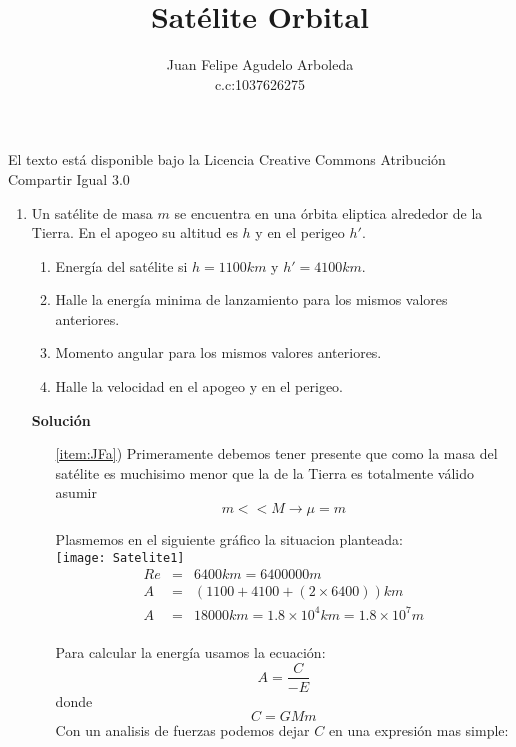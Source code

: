 \documentclass[12pt]{article}
\title{Satélite Orbital}
\author{Juan Felipe Agudelo Arboleda \\c.c:1037626275}
\begin{document}
\maketitle


El texto está disponible bajo la Licencia Creative Commons Atribución Compartir Igual 3.0
\begin{enumerate} 

\item Un satélite de masa $m$ se encuentra en una órbita eliptica alrededor de la Tierra. En el apogeo su altitud es $h$ y en el perigeo $h'$. 

 
  \begin{minipage}{0.6\linewidth}
    \begin{enumerate}
    \item Energía del satélite si $h=1100 km$ y $h'=4100 km$.
      \label{item:JFa}
    \item Halle la energía minima de lanzamiento para los mismos valores anteriores.
      \label{item:JFb}
      \item Momento angular para los mismos valores anteriores.
      \label{item:JFc}    
     \item Halle la velocidad en el apogeo y en el perigeo.
      \label{item:JFd}
    \end{enumerate}
  \end{minipage}
  
  \textbf{Solución}
  \begin{itemize}  
  
  \item[\ref{item:JFa})]
  Primeramente debemos tener presente que como la masa del satélite es muchisimo menor que la de la Tierra es totalmente válido asumir
\begin{equation} 
m<<M\rightarrow\mu=m\nonumber
\end{equation}

Plasmemos en el siguiente gráfico la situacion planteada:\\
  \texttt{[image: Satelite1]}\\
  \begin{eqnarray}
  Re&=&6400 km=6400000 m\nonumber\\ 
  A&=&(1100+4100+(2\times6400)) km\nonumber\\
  A&=&18000  km = 1.8\times10^4 km = 1.8\times10^7 m\\
   \nonumber
 \end{eqnarray}
 
 Para calcular la energía usamos la ecuación:
\begin{equation}
A=\frac{C}{-E}\nonumber
\end{equation}
donde
\begin{equation}
C=G M m\nonumber
\end{equation} 
Con un analisis de fuerzas podemos dejar $C$ en una expresión mas simple:\\
\begin{center}



\end{center}
\end{itemize}
\end{enumerate}
\end{document}
